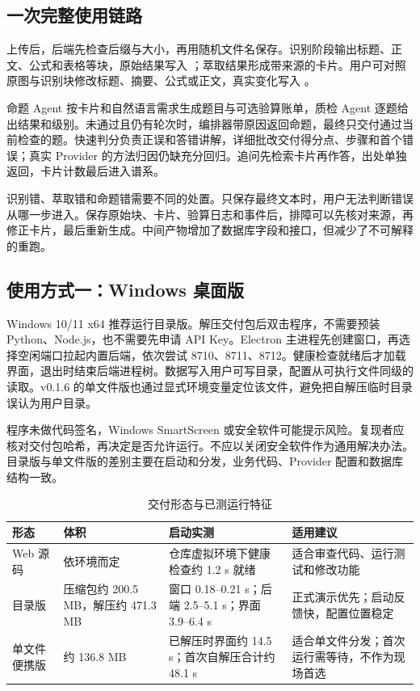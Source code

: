 \subsection{一次完整使用链路}

上传后，后端先检查后缀与大小，再用随机文件名保存。识别阶段输出标题、正文、公式和表格等块，原始结果写入 ；萃取结果形成带来源的卡片。用户可对照原图与识别块修改标题、摘要、公式或正文，真实变化写入 。

命题 Agent 按卡片和自然语言需求生成题目与可选验算账单，质检 Agent 逐题给出结果和级别。未通过且仍有轮次时，编排器带原因返回命题，最终只交付通过当前检查的题。快速判分负责正误和答错讲解，详细批改交付得分点、步骤和首个错误；真实 Provider 的方法归因仍缺充分回归。追问先检索卡片再作答，出处单独返回，卡片计数最后进入谱系。

\begin{keybox}[为什么保留中间产物]
识别错、萃取错和命题错需要不同的处置。只保存最终文本时，用户无法判断错误从哪一步进入。保存原始块、卡片、验算日志和事件后，排障可以先核对来源，再修正卡片，最后重新生成。中间产物增加了数据库字段和接口，但减少了不可解释的重跑。
\end{keybox}

\subsection{使用方式一：Windows 桌面版}

Windows 10/11 x64 推荐运行目录版。解压交付包后双击程序，不需要预装 Python、Node.js，也不需要先申请 API Key。Electron 主进程先创建窗口，再选择空闲端口拉起内置后端，依次尝试 8710、8711、8712。健康检查就绪后才加载界面，退出时结束后端进程树。数据写入用户可写目录，配置从可执行文件同级的  读取。v0.1.6 的单文件版也通过显式环境变量定位该文件，避免把自解压临时目录误认为用户目录。

程序未做代码签名，Windows SmartScreen 或安全软件可能提示风险。复现者应核对交付包哈希，再决定是否允许运行。不应以关闭安全软件作为通用解决办法。目录版与单文件版的差别主要在启动和分发，业务代码、Provider 配置和数据库结构一致。

\begin{table}[H]
\centering\footnotesize
\caption{交付形态与已测运行特征}
\begin{tabularx}{\textwidth}{@{}L{2.6cm}L{2.7cm}L{3.1cm}Y@{}}
\toprule
\textbf{形态} & \textbf{体积} & \textbf{启动实测} & \textbf{适用建议} \\
\midrule
Web 源码 & 依环境而定 & 仓库虚拟环境下健康检查约 1.2 s 就绪 & 适合审查代码、运行测试和修改功能 \\
目录版 & 压缩包约 200.5 MB，解压约 471.3 MB & 窗口 0.18--0.21 s；后端 2.5--5.1 s；界面 3.9--6.4 s & 正式演示优先；启动反馈快，配置位置稳定 \\
单文件便携版 & 约 136.8 MB & 已解压时界面约 14.5 s；首次自解压合计约 48.1 s & 适合单文件分发；首次运行需等待，不作为现场首选 \\
\bottomrule
\end{tabularx}
\end{table}


